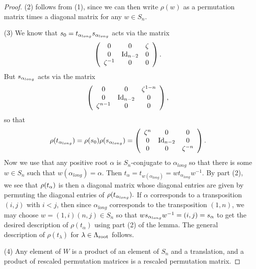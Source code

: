 \begin{proof}
    (2) follows from (1), since we can then write $\rho(w)$ as a permutation matrix times a diagonal matrix for any $w\in S_n$.
    
    (3) We know that $s_0=t_{\alpha_{long}}s_{\alpha_{long}}$ acts via the matrix
    \[\left({\begin{array}{ccccccccccc}
             
         0  &0 &\zeta\\
         0  &\operatorname{Id}_{n-2} &0\\
         \zeta^{-1} &0 &0  \\
           \end{array} }  \right).
        \]
    But $s_{\alpha_{long}}$ acts via  the matrix 
    \[\left({\begin{array}{ccccccccccc}
             
         0  &0 &\zeta^{1-n}\\
         0  &\operatorname{Id}_{n-2} &0\\
         \zeta^{n-1} &0 &0  \\
           \end{array} }  \right),
        \]
    so that 
    \[\rho(t_{\alpha_{long}})=\rho(s_0)\rho(s_{\alpha_{long}})= 
    \left({\begin{array}{ccccccccccc}
             
         \zeta^{n} &0 &0\\
         0  &\operatorname{Id}_{n-2} &0\\
         0 &0 &\zeta^{-n}  \\
           \end{array} }  \right).
        \]
        Now we use that any positive root $\alpha$ is $S_n$-conjugate to $\alpha_{long}$ so that there is some $w \in S_n$ such that $w(\alpha_{long})=\alpha$. 
        Then $t_\alpha=t_{w(\alpha_{long})}=wt_{\alpha_{long}}w^{-1}$. 
        By part (2), we see that $\rho(t_{\alpha})$ is then a diagonal matrix whose diagonal entries are given by permuting the diagonal entries of $\rho(t_{\alpha_{long}}).$ 
        If $\alpha$ corresponds to a transposition $(i,j)$ with $i<j$, then since $\alpha_{long}$ corresponds to the transposition $(1,n)$, we may choose $w=(1,i)(n,j) \in S_n$ so that $ws_{\alpha_{long}}w^{-1}=(i,j)=s_{\alpha}$ to get the desired description of $\rho(t_{\alpha})$ using part (2) of the lemma. The general description of $\rho(t_{\lambda})$ for $\lambda \in \Lambda_{\operatorname{root}}$ follows.
        
    (4) Any element of $W$ is a product of an element of $S_n$ and a translation, and a product of rescaled permutation matrices is a rescaled permutation matrix. 
\end{proof}

